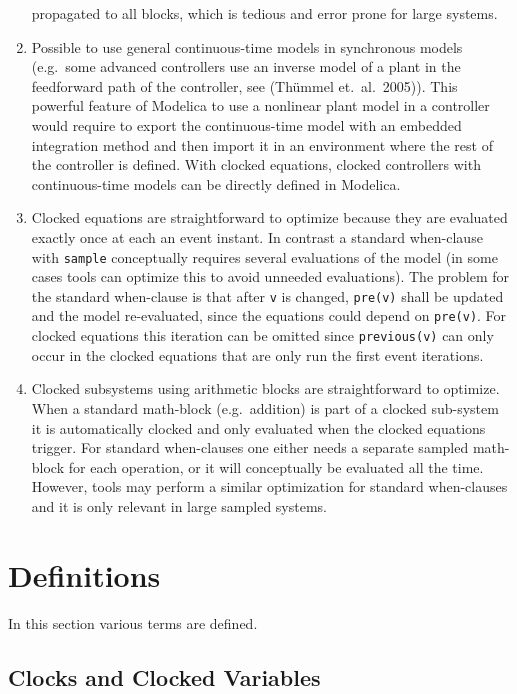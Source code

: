 \begin{nonnormative}
\begin{enumerate}
  propagated to all blocks, which is tedious and error prone for large systems.
\item
  Possible to use general continuous-time models in synchronous models
  (e.g.\ some advanced controllers use an inverse model of a
  plant in the feedforward path of the controller, see (Thümmel et.~al.\ 2005)).
  This powerful feature of Modelica to use a nonlinear plant
  model in a controller would require to export the continuous-time
  model with an embedded integration method and then import it in an
  environment where the rest of the controller is defined. With clocked
  equations, clocked controllers with continuous-time models can be
  directly defined in Modelica.
\item
  Clocked equations are straightforward to optimize because they are
  evaluated exactly once at each an event instant.
  In contrast a standard when-clause with \lstinline!sample! conceptually
  requires several evaluations of the model (in some cases tools
  can optimize this to avoid unneeded evaluations).
  The problem for the standard when-clause is that after \lstinline!v!
  is changed, \lstinline!pre(v)! shall be updated and the model re-evaluated,
  since the equations could depend on \lstinline!pre(v)!.
  For clocked equations this iteration can be omitted
  since \lstinline!previous(v)! can only occur in the clocked equations
  that are only run the first event iterations.
\item
  Clocked subsystems using arithmetic blocks are straightforward to optimize.
  When a standard math-block (e.g.\ addition) is part of a clocked sub-system it is automatically
  clocked and only evaluated when the clocked equations trigger.
  For standard when-clauses one either needs a separate sampled math-block for each operation, or
  it will conceptually be evaluated all the time.
  However, tools may perform a similar optimization for standard when-clauses
  and it is only relevant in large sampled systems.
\end{enumerate}
\end{nonnormative}

\section{Definitions}\label{definitions}

In this section various terms are defined.

\subsection{Clocks and Clocked Variables}\label{clocks-and-clocked-variables}

